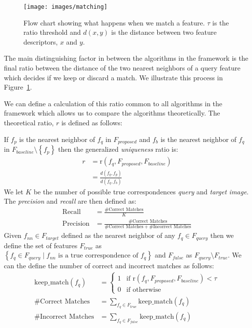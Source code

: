 \documentclass[journal]{IEEEtran}
\newcommand{\twopartdef}[4]
{
	\left\{
		\begin{array}{ll}
			#1 & \mbox{if } #2 \\
			#3 & \mbox{if } #4
		\end{array}
	\right.
}
\begin{document}
\begin{figure}[t]
\centering
\texttt{[image: images/matching]}
\caption{Flow chart showing what happens when we match a feature. $\tau$ 
is the ratio threshold and $d(x,y)$ is the distance between two feature 
descriptors, $x$ and $y$.}
\label{fig:matching}
\end{figure}
%

The main distinguishing factor in between the algorithms in the 
framework is the final ratio between the distance of the two nearest 
neighbors of a query feature which decides if we keep or discard a 
match. We illustrate this process in Figure~\ref{fig:matching}. 

We can define a calculation of this ratio common to all algorithms in 
the framework which allows us to compare the algorithms theoretically. 
The theoretical ratio, $r$ is defined as follows:

If $f_{p}$ is the nearest neighbor of $f_{q}$ in $F_{proposed}$ and 
$f_{b}$ is the nearest neighbor of $f_{q}$ in $F_{baseline} \setminus 
\left\{f_{p}\right\}$ then the generalized \emph{uniqueness} ratio is:
\begin{align*}
    r &= \text{r}(f_{q}, F_{proposed}, F_{baseline}) \\
        &= \frac{d(f_{q}, f_{p})}{d(f_{q}, f_{b})}
\end{align*}
We let $K$ be the number of possible true correspondences \emph{query} 
and \emph{target image}. The \emph{precision} and \emph{recall} are then 
defined as:
\begin{align*}
    \textrm{Recall} &= \frac{\#\textrm{Correct Matches}}{K} \\
    \textrm{Precision} &= \frac{\#\textrm{Correct 
    Matches}}{\#\textrm{Correct Matches} + \#\textrm{Incorrect Matches}}
\end{align*}
Given $f_{nn} \in F_{target}$ defined as the nearest neighbor of any 
$f_q \in F_{query}$ then we define the set of features $F_{true}$ as 
$\left\{ f_{q} \in F_{query} \mid f_{nn} \text{ is a true correspondence 
of } f_{q} \right\}$ and $F_{false}$ as $F_{query} \setminus F_{true}$.  
We can the define the number of correct and incorrect matches as 
follows:
\begin{align*}
    \textrm{keep\_match}(f_{q}) &= \twopartdef{ 1 }{\text{r}(f_{q}, 
    F_{proposed}, F_{baseline}) <
    \tau}{0}{\textrm{otherwise}} \\
    \#\textrm{Correct Matches} &= \sum_{f_{q} \in F_{true}} 
    \textrm{keep\_match}(f_{q})\\
    \#\textrm{Incorrect Matches} &= \sum_{f_{q} \in F_{false}}
    \textrm{keep\_match}(f_{q})
\end{align*}
\end{document}
